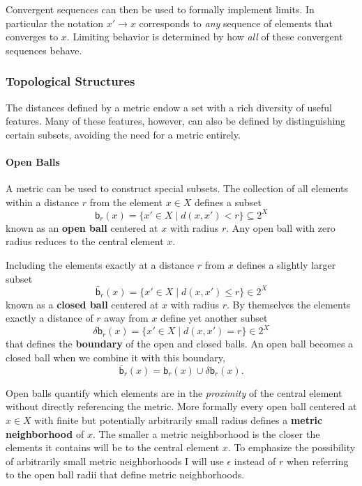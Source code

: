 \documentclass[
  letterpaper,
  DIV=11,
  numbers=noendperiod]{scrartcl}
\let\oldparagraph\paragraph
\renewcommand{\paragraph}[1]{\oldparagraph{#1}\mbox{}}
\begin{document}
Convergent sequences can then be used to formally implement limits. In
particular the notation \(x' \rightarrow x\) corresponds to \emph{any}
sequence of elements that converges to \(x\). Limiting behavior is
determined by how \emph{all} of these convergent sequences behave.

\hypertarget{sec:topologies}{%
\subsubsection{Topological Structures}\label{sec:topologies}}

The distances defined by a metric endow a set with a rich diversity of
useful features. Many of these features, however, can also be defined by
distinguishing certain subsets, avoiding the need for a metric entirely.

\hypertarget{sec:open-balls}{%
\paragraph{Open Balls}\label{sec:open-balls}}

A metric can be used to construct special subsets. The collection of all
elements within a distance \(r\) from the element \(x \in X\) defines a
subset \[
\mathsf{b}_{r}(x) = \{ x' \in X \mid d(x, x') < r \} \subseteq 2^{X}
\] known as an \textbf{open ball} centered at \(x\) with radius \(r\).
Any open ball with zero radius reduces to the central element \(x\).

Including the elements exactly at a distance \(r\) from \(x\) defines a
slightly larger subset \[
\bar{\mathsf{b}}_{r}(x) = \{ x' \in X \mid d(x, x') \le r \} \in 2^{X}
\] known as a \textbf{closed ball} centered at \(x\) with radius \(r\).
By themselves the elements exactly a distance of \(r\) away from \(x\)
define yet another subset \[
\delta \mathsf{b}_{r}(x) = \{ x' \in X \mid d(x, x') = r \} \in 2^{X}
\] that defines the \textbf{boundary} of the open and closed balls. An
open ball becomes a closed ball when we combine it with this boundary,
\[
\bar{\mathsf{b}}_{r}(x) = \mathsf{b}_{r}(x) \cup \delta \mathsf{b}_{r}(x).
\]

Open balls quantify which elements are in the \emph{proximity} of the
central element without directly referencing the metric. More formally
every open ball centered at \(x \in X\) with finite but potentially
arbitrarily small radius defines a \textbf{metric neighborhood} of
\(x\). The smaller a metric neighborhood is the closer the elements it
contains will be to the central element \(x\). To emphasize the
possibility of arbitrarily small metric neighborhoods I will use
\(\epsilon\) instead of \(r\) when referring to the open ball radii that
define metric neighborhoods.
\end{document}
